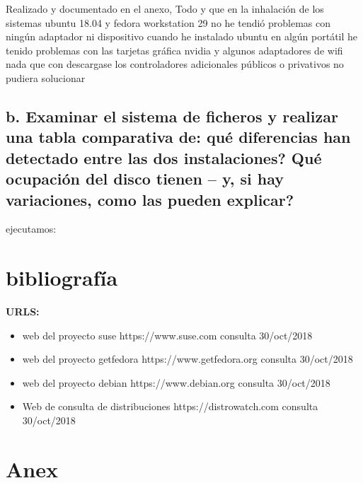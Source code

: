 \documentclass[preprint,11pt]{elsarticle}
\begin{document}
Realizado y documentado en el anexo, Todo y que en la inhalación de los sistemas ubuntu 18.04 y fedora workstation 29 no he tendió problemas con ningún adaptador ni dispositivo cuando he instalado ubuntu en algún portátil he tenido problemas con las tarjetas gráfica nvidia y algunos adaptadores de wifi nada que con descargase los controladores adicionales públicos o privativos no pudiera solucionar

\subsection{b. Examinar el sistema de ficheros y realizar una tabla comparativa de: qué diferencias han detectado entre las dos instalaciones? Qué ocupación del disco tienen – y, si hay variaciones, como las pueden explicar?}
ejecutamos:


\clearpage
\section{bibliografía}
    \textbf{URLS:}
    \begin{itemize}
        \item web del proyecto suse https://www.suse.com consulta 30/oct/2018
        \item web del proyecto getfedora https://www.getfedora.org consulta 30/oct/2018
        \item web del proyecto debian  https://www.debian.org consulta 30/oct/2018
        \item Web de consulta de distribuciones https://distrowatch.com consulta 30/oct/2018
    \end{itemize}

\clearpage
\section{Anex}
\end{document}
